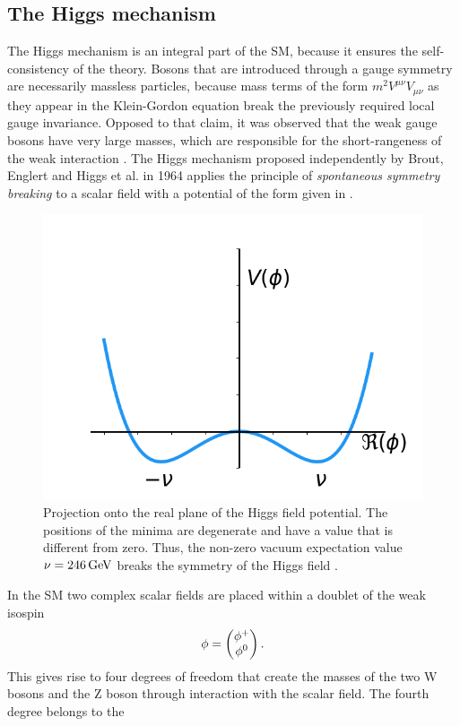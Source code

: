 \subsection{The Higgs mechanism}

The Higgs mechanism is an integral part of the SM, because it ensures the self-consistency of the theory. Bosons that are introduced
through a gauge symmetry are necessarily massless particles, because mass terms of the form $m^2V^{\mu\nu}V_{\mu\nu}$ as they appear in the Klein-Gordon equation break the previously required local gauge invariance. 
Opposed to that claim, it was observed that the weak gauge bosons have very large masses, which are
responsible for the short-rangeness of the weak interaction \cite{ARNISON1983103}. The Higgs mechanism proposed independently by Brout, Englert and Higgs et al. in 1964 \cite{PhysRevLett.13.508,PhysRevLett.13.321,PhysRevLett.13.585,1964PhL....12..132H,PhysRev.145.1156} applies the 
principle of \textit{spontaneous symmetry breaking} to a scalar field with a potential of the form given in . \newline{}
\begin{figure}[!h]
    \centering
    \includegraphics[width = .5\textwidth]{Figures/theory/Higgs_potential}
    \caption[Higgs field potential.]{Projection onto the real plane of the Higgs field potential. The positions of the minima are degenerate and have a value that is different from zero. Thus, the non-zero vacuum expectation value $\nu = \text{246\,{GeV}}$ breaks 
    the symmetry of the Higgs field .}\label{theory:Higgs_potential}
\end{figure}%
In the SM two complex scalar fields are placed within a doublet of the weak isospin
\begin{equation}
    \phi = \begin{pmatrix} \phi^+ \\ \phi^0 \end{pmatrix}. 
\end{equation}
This gives rise to four degrees of freedom that create the masses of the two W bosons and the Z boson through interaction with the scalar field. The fourth degree belongs to the 
